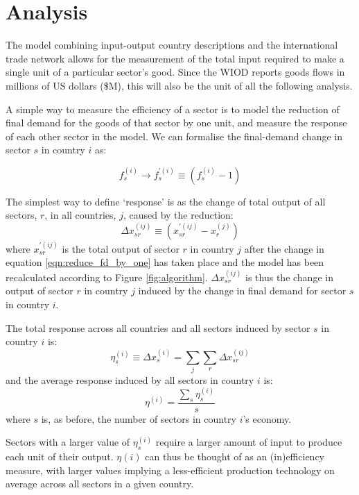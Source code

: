 \documentclass[a4paper]{article}
\begin{document}
\section{Analysis}\label{sec:analysis}
The model combining input-output country descriptions and the international trade network allows for the measurement of the total input required to make a single unit of a particular sector's good.
Since the WIOD reports goods flows in millions of US dollars (\$M), this will also be the unit of all the following analysis.

A simple way to measure the efficiency of a sector is to model the reduction of final demand for the goods of that sector by one unit, and measure the response of each other sector in the model. We can formalise the final-demand change in sector $s$ in country $i$ as:

\begin{equation}\label{eqn:reduce_fd_by_one}
f_s^{(i)} \rightarrow f_s^{\prime (i)} \equiv (f_s^{(i)} - 1)
\end{equation}

The simplest way to define `response' is as the change of total output of all sectors, $r$, in all countries, $j$, caused by the reduction:
\begin{equation}
\Delta x_{sr}^{(ij)} \equiv (x_{sr}^{\prime(ij)} - x_r^{(j)})
\end{equation}
where $x_{sr}^{\prime(ij)}$ is the total output of sector $r$ in country $j$ after the change in equation \eqref{eqn:reduce_fd_by_one} has taken place and the model has been recalculated according to Figure \ref{fig:algorithm}.
$\Delta x_{sr}^{(ij)}$ is thus the change in output of sector $r$ in country $j$ induced by the change in final demand for sector $s$ in country $i$.

The total response across all countries and all sectors induced by sector $s$ in country $i$ is:
\begin{equation}
\eta_s^{(i)} \equiv \Delta x_{s}^{(i)} = \sum_j \sum_r \Delta x_{sr}^{(ij)}
\end{equation}
and the average response induced by all sectors in country $i$ is:
\begin{equation}
\eta^{(i)} = \frac{\sum_s \eta_s^{(i)}}{s}
\end{equation}
where $s$ is, as before, the number of sectors in country $i$'s economy.

Sectors with a larger value of $\eta_s^{(i)}$ require a larger amount of input to produce each unit of their output. $\eta{(i)}$ can thus be thought of as an (in)efficiency measure, with larger values implying a less-efficient production technology on average across all sectors in a given country.
\end{document}
